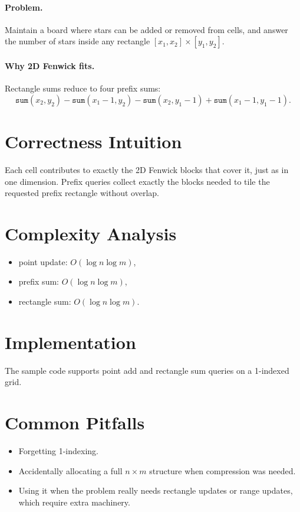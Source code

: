 \paragraph{Problem.}
Maintain a board where stars can be added or removed from cells, and answer the number of stars inside any rectangle
\([x_1, x_2] \times [y_1, y_2]\).

\paragraph{Why 2D Fenwick fits.}
Rectangle sums reduce to four prefix sums:
\[
\texttt{sum}(x_2,y_2)-\texttt{sum}(x_1-1,y_2)-\texttt{sum}(x_2,y_1-1)+\texttt{sum}(x_1-1,y_1-1).
\]

\section*{Correctness Intuition}

Each cell contributes to exactly the 2D Fenwick blocks that cover it, just as in one dimension. Prefix queries collect
exactly the blocks needed to tile the requested prefix rectangle without overlap.

\section*{Complexity Analysis}

\begin{itemize}
  \item point update: \(O(\log n \log m)\),
  \item prefix sum: \(O(\log n \log m)\),
  \item rectangle sum: \(O(\log n \log m)\).
\end{itemize}

\section*{Implementation}

The sample code supports point add and rectangle sum queries on a 1-indexed grid.

\section*{Common Pitfalls}

\begin{itemize}
  \item Forgetting 1-indexing.
  \item Accidentally allocating a full \(n \times m\) structure when compression was needed.
  \item Using it when the problem really needs rectangle updates or range updates, which require extra machinery.
\end{itemize}

